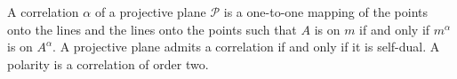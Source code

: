 A correlation $\alpha$ of a projective plane $\mathcal{P}$ is a one-to-one mapping of the points onto the lines and the lines onto the points such that $A$ is on $m$ if and only if $m^\alpha$ is on $A^\alpha$. A projective plane admits a correlation if and only if it is self-dual. A polarity is a correlation of order two.
